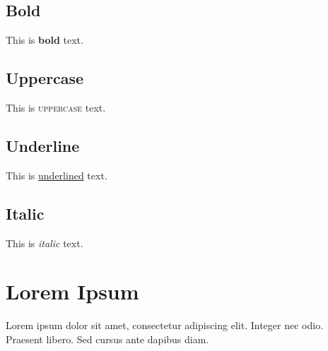\documentclass[12pt,a4paper,french]{designreport}
\begin{document}
\subsection{Bold}
This is \textbf{bold} text.

\subsection{Uppercase}
This is \textsc{uppercase} text.

\subsection{Underline}
This is \underline{underlined} text.

\subsection{Italic}
This is \textit{italic} text.

\section{Lorem Ipsum}
Lorem ipsum dolor sit amet, consectetur adipiscing elit. Integer nec odio. Praesent libero. Sed cursus ante dapibus diam.
\end{document}
